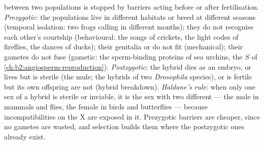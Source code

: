 \begin{proposition}\label{prop:b2:speciation:isolation}
 between two populations is stopped by barriers acting
before or after fertilisation. \emph{Prezygotic}: the populations
live in different habitats or breed at different seasons (temporal
isolation: two frogs calling in different months); they do not
recognise each other's courtship (behavioural: the songs of
crickets, the light codes of fireflies, the dances of ducks); their
genitalia or  do not fit (mechanical); their gametes do not
fuse (gametic: the sperm-binding proteins of sea urchins, the
$S$  of \cref{ch:b2:angiosperm-reproduction}).
\emph{Postzygotic}: the hybrid dies as an embryo, or lives but is
sterile (the mule; the hybrids of two \emph{Drosophila} species), or
is fertile but its own offspring are not (hybrid breakdown).
\emph{Haldane's rule}: when only one sex of a hybrid is sterile or
inviable, it is the sex with two different  --- the
male in mammals and flies, the female in birds and butterflies ---
because  incompatibilities on the X are exposed in it.
Prezygotic barriers are cheaper, since no gametes are wasted, and
selection builds them where the postzygotic ones already exist.
\end{proposition}


